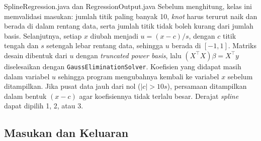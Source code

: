 \begin{kelas}{SplineRegression.java dan RegressionOutput.java}
Sebelum menghitung, kelas ini memvalidasi masukan: jumlah titik paling banyak 10, \textit{knot} harus terurut naik dan berada di dalam rentang data, serta jumlah titik tidak boleh kurang dari jumlah basis. Selanjutnya, setiap $x$ diubah menjadi $u = (x - c)/s$, dengan $c$ titik tengah dan $s$ setengah lebar rentang data, sehingga $u$ berada di $[-1, 1]$. Matriks desain dibentuk dari $u$ dengan \textit{truncated power basis}, lalu $(X^{\top}X)\beta = X^{\top}y$ diselesaikan dengan \texttt{GaussEliminationSolver}. Koefisien yang didapat masih dalam variabel $u$ sehingga program mengubahnya kembali ke variabel $x$ sebelum ditampilkan. Jika pusat data jauh dari nol ($|c| > 10s$), persamaan ditampilkan dalam bentuk $(x - c)$ agar koefisiennya tidak terlalu besar. Derajat \textit{spline} dapat dipilih 1, 2, atau 3.
 
 
 
\end{kelas}

\subsection{Masukan dan Keluaran}


